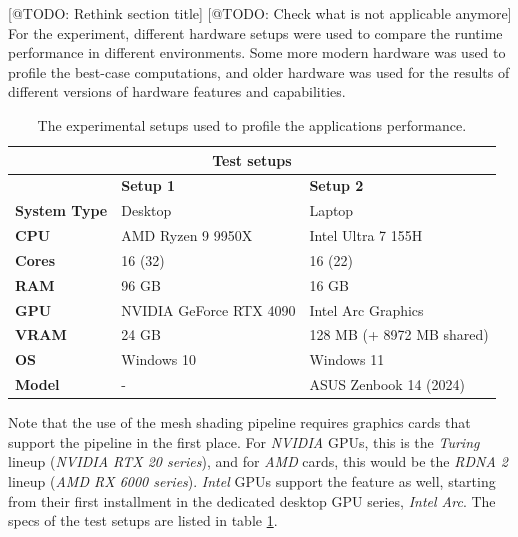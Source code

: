 [@TODO: Rethink section title] [@TODO: Check what is not applicable anymore]
For the experiment, different hardware setups were used to compare the runtime performance in different environments.
Some more modern hardware was used to profile the best-case computations, and older hardware was used for the results 
of different versions of hardware features and capabilities.

\begin{table}[h]          %
    \begin{tabular}{|lll|}
        \hline
        \multicolumn{3}{|c|}{\textbf{Test setups}}                                                                              \\ \hline
        \multicolumn{1}{|l|}{}                     & \multicolumn{1}{l|}{\textbf{Setup 1}}          & \textbf{Setup 2}          \\ \hline
        \multicolumn{1}{|l|}{\textbf{System Type}} & \multicolumn{1}{l|}{Desktop}                   & Laptop                    \\
        \multicolumn{1}{|l|}{\textbf{CPU}}         & \multicolumn{1}{l|}{AMD Ryzen 9 9950X}         & Intel Ultra 7 155H        \\
        \multicolumn{1}{|l|}{\textbf{Cores}}       & \multicolumn{1}{l|}{16 (32)}                   & 16 (22)                   \\
        \multicolumn{1}{|l|}{\textbf{RAM}}         & \multicolumn{1}{l|}{96 GB}                     & 16 GB                     \\
        \multicolumn{1}{|l|}{\textbf{GPU}}         & \multicolumn{1}{l|}{NVIDIA GeForce RTX 4090}   & Intel Arc Graphics        \\
        \multicolumn{1}{|l|}{\textbf{VRAM}}        & \multicolumn{1}{l|}{24 GB}                     & 128 MB (+ 8972 MB shared) \\
        \multicolumn{1}{|l|}{\textbf{OS}}          & \multicolumn{1}{l|}{Windows 10}                & Windows 11                \\
        \multicolumn{1}{|l|}{\textbf{Model}}       & \multicolumn{1}{l|}{-}                         & ASUS Zenbook 14 (2024)    \\ \hline
    \end{tabular}
    \caption{The experimental setups used to profile the applications performance.}
    \label{tbl:hardware-setup}
\end{table}

\noindent
Note that the use of the mesh shading pipeline requires graphics cards that support the pipeline in the first place. 
For \emph{NVIDIA} \ac{GPU}s, this is the \emph{Turing} lineup (\emph{NVIDIA RTX 20 series}), and for \emph{AMD} cards, 
this would be the \emph{RDNA 2} lineup (\emph{AMD RX 6000 series}). \emph{Intel} \ac{GPU}s support the feature as 
well, starting from their first installment in the dedicated desktop \ac{GPU} series, \emph{Intel Arc}. The specs of 
the test setups are listed in table \ref{tbl:hardware-setup}. \\


